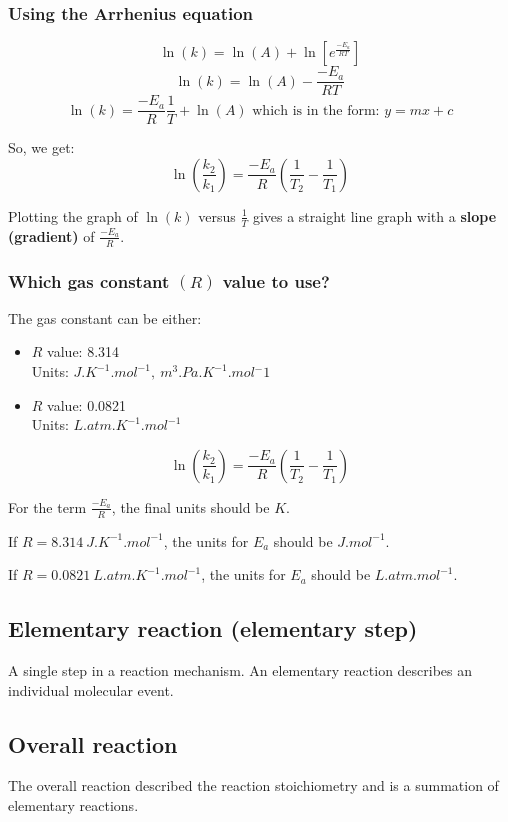 \documentclass[11pt]{article}
\begin{document}
\subsubsection{Using the Arrhenius equation}
\label{sec:org2672d5e}
\[\ln (k) = \ln (A) + \ln \left[e^{\frac{-E_a}{RT}} \right]\]
\[\ln (k) = \ln (A) - \frac{-E_a}{RT}\]
\[\ln (k) = \frac{-E_a}{R} \frac{1}{T} + \ln (A) \text{ which is in the form: } y = mx + c\]


So, we get:
\[\ln \left( \frac{k_2}{k_1} \right) = \frac{-E_a}{R} \left( \frac{1}{T_2} - \frac{1}{T_1} \right)\]

Plotting the graph of \(\ln(k)\) versus \(\frac{1}{T}\) gives a straight line graph with a \textbf{slope (gradient)} of \(\frac{-E_a}{R}\).

\newpage
\subsubsection{Which gas constant \((R)\) value to use?}
\label{sec:org1bc1eb5}
The gas constant can be either:

\begin{itemize}
\item \(R\) value: 8.314 \\
Units: \(\unit{J.K^{-1}.mol^{-1}}, \ \unit{m^3.Pa.K^{-1}.mol{^-1}}\)

\item \(R\) value: 0.0821 \\
Units: \(\unit{L.atm.K^{-1}.mol^{-1}}\)
\end{itemize}

\[\ln \left( \frac{k_2}{k_1} \right) = \frac{-E_a}{R} \left( \frac{1}{T_2} - \frac{1}{T_1} \right)\]


For the term \(\frac{-E_a}{R}\), the final units should be \(\unit{K}\).


If \(R = \qty{8.314}{\unit{J.K^{-1}.mol^{-1}}}\), the units for \(E_a\) should be \(\unit{J.mol^{-1}}\).

If \(R = \qty{0.0821}{\unit{L.atm.K^{-1}.mol^{-1}}}\), the units for \(E_a\) should be \(\unit{L.atm.mol^{-1}}\).
\subsection{Elementary reaction (elementary step)}
\label{sec:org5525c2d}
A single step in a reaction mechanism. An elementary reaction describes an individual molecular event.
\subsection{Overall reaction}
\label{sec:org7db3fe3}
The overall reaction described the reaction stoichiometry and is a summation of elementary reactions.
\end{document}
